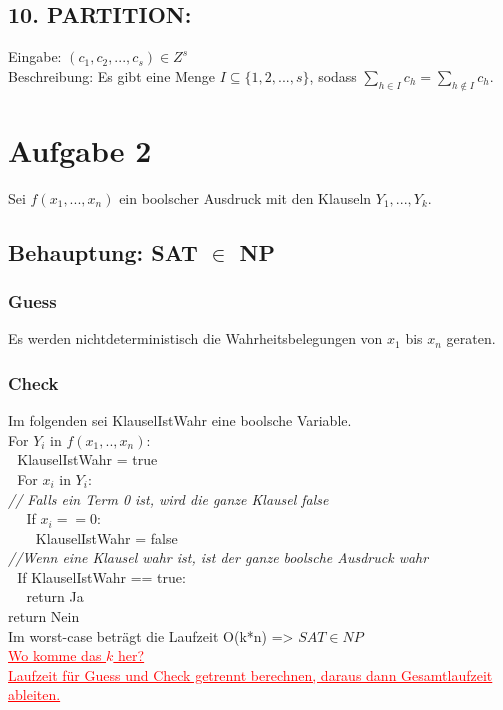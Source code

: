 \documentclass[a4paper,11pt,twoside]{article}
\newcommand{\korr}[2]{\sout{#1} \textcolor{red}{\underline{#2}}}
\begin{document}
\subsection*{10. PARTITION:}
Eingabe: $(c_1, c_2, ..., c_s) \in Z^{s}$\\
Beschreibung: Es gibt eine Menge $I \subseteq \{1,2,...,s\}$, sodass $\sum_{h \in I} c_h = \sum_{h \notin I} c_h$.\\


\section*{Aufgabe 2}
Sei $f(x_1, ..., x_n)$ ein boolscher Ausdruck mit den Klauseln $Y_1, ..., Y_k$. 

\subsection*{Behauptung: SAT $\in$ NP}
\subsubsection*{Guess}
Es werden nichtdeterministisch die Wahrheitsbelegungen von $x_1$ bis $x_n$ geraten.
\subsubsection*{Check}
Im folgenden sei KlauselIstWahr eine boolsche Variable.\\
For $Y_i$ in $f(x_1,.., x_n)$:\\
$~~~$KlauselIstWahr = true\\
$~~~$For $x_i$ in $Y_i$:\\
\textit{// Falls ein Term 0 ist, wird die ganze Klausel false}\\
$~~~~~~$If $x_i == 0$:\\ 
$~~~~~~~~~$KlauselIstWahr = false\\
\textit{//Wenn eine Klausel wahr ist, ist der ganze boolsche Ausdruck wahr}\\
$~~~$If KlauselIstWahr == true:\\
$~~~~~~$return Ja\\
return Nein\\

Im worst-case beträgt die Laufzeit O(k*n) => $SAT \in NP$\\
\korr{}{Wo komme das $k$ her?}\\
\korr{}{Laufzeit für Guess und Check getrennt berechnen, daraus dann Gesamtlaufzeit ableiten.}
\end{document}
